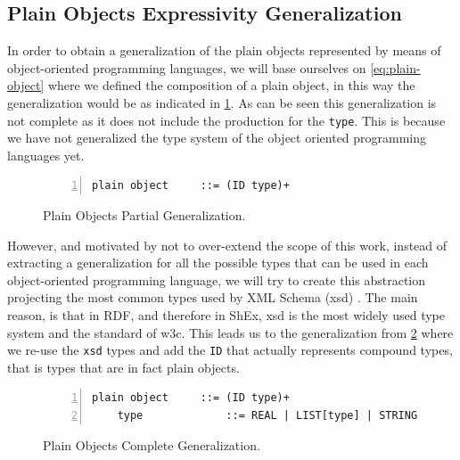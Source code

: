\subsection{Plain Objects Expressivity Generalization}
In order to obtain a generalization of the plain objects represented by means of object-oriented programming languages,
we will base ourselves on \cref{eq:plain-object} where we defined the composition of a plain object, in this way the
generalization would be as indicated in \cref{fig:po-generalization}. As can be seen this generalization is not complete
as it does not include the production for the \texttt{type}. This is because we have not generalized the type system of the
object oriented programming languages yet.

\begin{figure}
    \begin{lstlisting}[numbers=left,basicstyle=\ttfamily\small]
    plain object     ::= (ID type)+
    \end{lstlisting}
    \caption[Plain Objects Partial Generalization]{Plain Objects Partial Generalization.}
    \label{fig:po-generalization}
\end{figure}

However, and motivated by not to over-extend the scope of this work, instead of extracting a generalization for all the possible types
that can be used in each object-oriented programming language, we will try to create this abstraction projecting the
most common types used by XML Schema (xsd) \cite{xmlschemasimpleelements}. The main reason, is that in RDF, and therefore in ShEx, xsd is the most widely
used type system and the standard of w3c. This leads us to the generalization from \cref{fig:po-generalization-complete} where we re-use the
\texttt{xsd} types and add the \texttt{ID} that actually represents compound types, that is types that are in fact plain objects.

\begin{figure}
    \begin{lstlisting}[numbers=left,basicstyle=\ttfamily\small]
    plain object     ::= (ID type)+
    type             ::= REAL | LIST[type] | STRING | BOOLEAN | ID
    \end{lstlisting}
    \caption[Plain Objects Complete Generalization]{Plain Objects Complete Generalization.}
    \label{fig:po-generalization-complete}
\end{figure}


